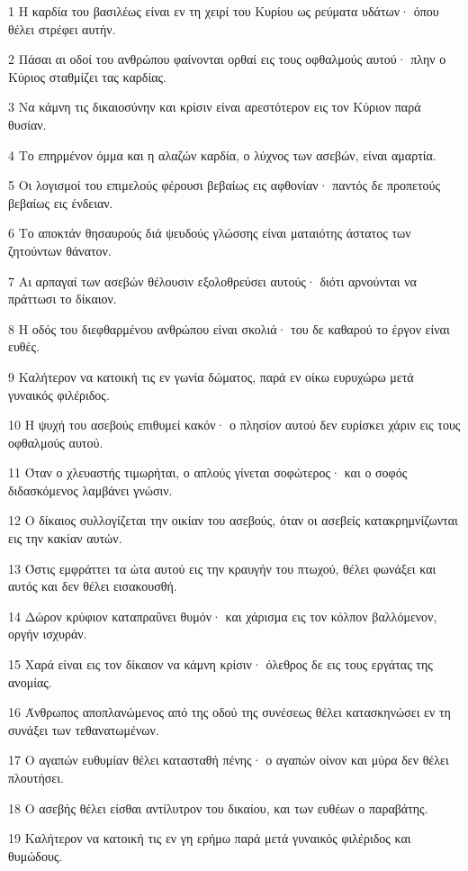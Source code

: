 \par 1 Η καρδία του βασιλέως είναι εν τη χειρί του Κυρίου ως ρεύματα υδάτων· όπου θέλει στρέφει αυτήν.
\par 2 Πάσαι αι οδοί του ανθρώπου φαίνονται ορθαί εις τους οφθαλμούς αυτού· πλην ο Κύριος σταθμίζει τας καρδίας.
\par 3 Να κάμνη τις δικαιοσύνην και κρίσιν είναι αρεστότερον εις τον Κύριον παρά θυσίαν.
\par 4 Το επηρμένον όμμα και η αλαζών καρδία, ο λύχνος των ασεβών, είναι αμαρτία.
\par 5 Οι λογισμοί του επιμελούς φέρουσι βεβαίως εις αφθονίαν· παντός δε προπετούς βεβαίως εις ένδειαν.
\par 6 Το αποκτάν θησαυρούς διά ψευδούς γλώσσης είναι ματαιότης άστατος των ζητούντων θάνατον.
\par 7 Αι αρπαγαί των ασεβών θέλουσιν εξολοθρεύσει αυτούς· διότι αρνούνται να πράττωσι το δίκαιον.
\par 8 Η οδός του διεφθαρμένου ανθρώπου είναι σκολιά· του δε καθαρού το έργον είναι ευθές.
\par 9 Καλήτερον να κατοική τις εν γωνία δώματος, παρά εν οίκω ευρυχώρω μετά γυναικός φιλέριδος.
\par 10 Η ψυχή του ασεβούς επιθυμεί κακόν· ο πλησίον αυτού δεν ευρίσκει χάριν εις τους οφθαλμούς αυτού.
\par 11 Όταν ο χλευαστής τιμωρήται, ο απλούς γίνεται σοφώτερος· και ο σοφός διδασκόμενος λαμβάνει γνώσιν.
\par 12 Ο δίκαιος συλλογίζεται την οικίαν του ασεβούς, όταν οι ασεβείς κατακρημνίζωνται εις την κακίαν αυτών.
\par 13 Όστις εμφράττει τα ώτα αυτού εις την κραυγήν του πτωχού, θέλει φωνάξει και αυτός και δεν θέλει εισακουσθή.
\par 14 Δώρον κρύφιον καταπραΰνει θυμόν· και χάρισμα εις τον κόλπον βαλλόμενον, οργήν ισχυράν.
\par 15 Χαρά είναι εις τον δίκαιον να κάμνη κρίσιν· όλεθρος δε εις τους εργάτας της ανομίας.
\par 16 Άνθρωπος αποπλανώμενος από της οδού της συνέσεως θέλει κατασκηνώσει εν τη συνάξει των τεθανατωμένων.
\par 17 Ο αγαπών ευθυμίαν θέλει κατασταθή πένης· ο αγαπών οίνον και μύρα δεν θέλει πλουτήσει.
\par 18 Ο ασεβής θέλει είσθαι αντίλυτρον του δικαίου, και των ευθέων ο παραβάτης.
\par 19 Καλήτερον να κατοική τις εν γη ερήμω παρά μετά γυναικός φιλέριδος και θυμώδους.
